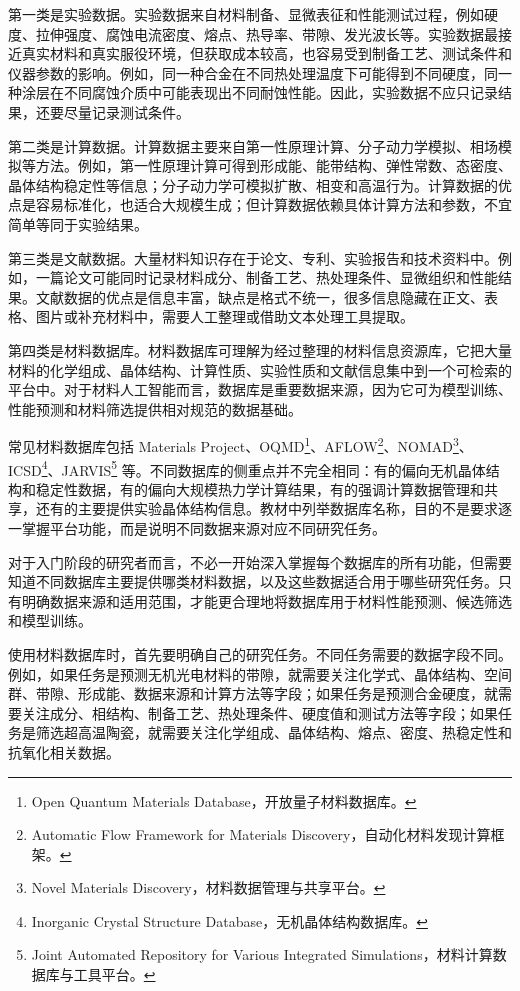 第一类是实验数据。实验数据来自材料制备、显微表征和性能测试过程，例如硬度、拉伸强度、腐蚀电流密度、熔点、热导率、带隙、发光波长等。实验数据最接近真实材料和真实服役环境，但获取成本较高，也容易受到制备工艺、测试条件和仪器参数的影响。例如，同一种合金在不同热处理温度下可能得到不同硬度，同一种涂层在不同腐蚀介质中可能表现出不同耐蚀性能。因此，实验数据不应只记录结果，还要尽量记录测试条件。


第二类是计算数据。计算数据主要来自第一性原理计算、分子动力学模拟、相场模拟等方法。例如，第一性原理计算可得到形成能、能带结构、弹性常数、态密度、晶体结构稳定性等信息；分子动力学可模拟扩散、相变和高温行为。计算数据的优点是容易标准化，也适合大规模生成；但计算数据依赖具体计算方法和参数，不宜简单等同于实验结果。


第三类是文献数据。大量材料知识存在于论文、专利、实验报告和技术资料中。例如，一篇论文可能同时记录材料成分、制备工艺、热处理条件、显微组织和性能结果。文献数据的优点是信息丰富，缺点是格式不统一，很多信息隐藏在正文、表格、图片或补充材料中，需要人工整理或借助文本处理工具提取。


第四类是材料数据库。材料数据库可理解为经过整理的材料信息资源库，它把大量材料的化学组成、晶体结构、计算性质、实验性质和文献信息集中到一个可检索的平台中。对于材料人工智能而言，数据库是重要数据来源，因为它可为模型训练、性能预测和材料筛选提供相对规范的数据基础。


常见材料数据库包括 Materials Project、OQMD\footnote{Open Quantum Materials Database，开放量子材料数据库。}、AFLOW\footnote{Automatic Flow Framework for Materials Discovery，自动化材料发现计算框架。}、NOMAD\footnote{Novel Materials Discovery，材料数据管理与共享平台。}、ICSD\footnote{Inorganic Crystal Structure Database，无机晶体结构数据库。}、JARVIS\footnote{Joint Automated Repository for Various Integrated Simulations，材料计算数据库与工具平台。} 等。不同数据库的侧重点并不完全相同：有的偏向无机晶体结构和稳定性数据，有的偏向大规模热力学计算结果，有的强调计算数据管理和共享，还有的主要提供实验晶体结构信息。教材中列举数据库名称，目的不是要求逐一掌握平台功能，而是说明不同数据来源对应不同研究任务。

对于入门阶段的研究者而言，不必一开始深入掌握每个数据库的所有功能，但需要知道不同数据库主要提供哪类材料数据，以及这些数据适合用于哪些研究任务。只有明确数据来源和适用范围，才能更合理地将数据库用于材料性能预测、候选筛选和模型训练。


使用材料数据库时，首先要明确自己的研究任务。不同任务需要的数据字段不同。例如，如果任务是预测无机光电材料的带隙，就需要关注化学式、晶体结构、空间群、带隙、形成能、数据来源和计算方法等字段；如果任务是预测合金硬度，就需要关注成分、相结构、制备工艺、热处理条件、硬度值和测试方法等字段；如果任务是筛选超高温陶瓷，就需要关注化学组成、晶体结构、熔点、密度、热稳定性和抗氧化相关数据。


